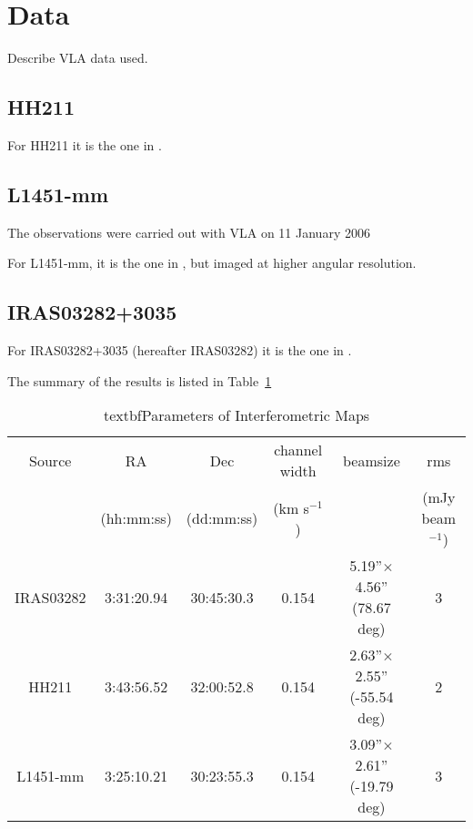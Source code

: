 \section{Data}

Describe VLA data used.

\subsection{HH211}
For HH211 it is the one in \cite{Tanner_2010}.


\subsection{L1451-mm}
The observations were carried out with VLA on 11 January 2006

For L1451-mm, it is the one in \cite{Pineda_2011}, but imaged at higher angular resolution.

\subsection{IRAS03282+3035}
For IRAS03282+3035 (hereafter IRAS03282) it is the one in \cite{Tobin_2011}. 

The summary of the results is listed in Table~\ref{table:obs}

\begin{table} 
\label{table:obs}
    \begin{tabular}{ c c c c c c }
        Source & RA & Dec & channel width & beamsize & rms \\ 
         & (hh:mm:ss) & (dd:mm:ss) & (km s$^{-1}$) &  & (mJy beam$^{-1}$) \\ 
        IRAS03282 & 3:31:20.94 & 30:45:30.3 & 0.154 & 5.19''$\times$4.56'' (78.67 deg) & 3 \\ 
        HH211 & 3:43:56.52 & 32:00:52.8 & 0.154 & 2.63''$\times$2.55'' (-55.54 deg) & 2 \\ 
        L1451-mm & 3:25:10.21 & 30:23:55.3 & 0.154 & 3.09''$\times$2.61'' (-19.79 deg) & 3 \\ 
    \end{tabular} 
    \caption {textbf{Parameters of Interferometric Maps}}
\end{table}
  
  
  
  
  
  
  
  
  
  
  
  
  
  
  
  
  
  
  